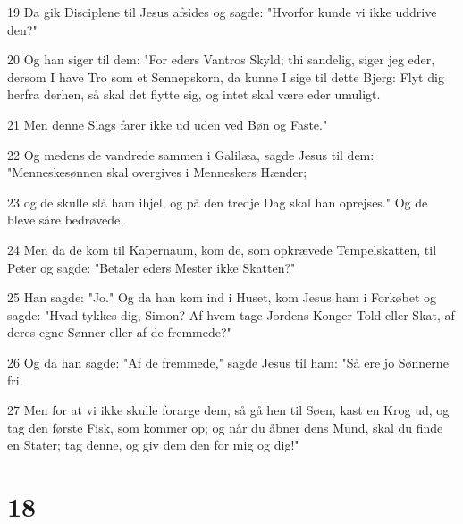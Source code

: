 \par 19 Da gik Disciplene til Jesus afsides og sagde: "Hvorfor kunde vi ikke uddrive den?"
\par 20 Og han siger til dem: "For eders Vantros Skyld; thi sandelig, siger jeg eder, dersom I have Tro som et Sennepskorn, da kunne I sige til dette Bjerg: Flyt dig herfra derhen, så skal det flytte sig, og intet skal være eder umuligt.
\par 21 Men denne Slags farer ikke ud uden ved Bøn og Faste."
\par 22 Og medens de vandrede sammen i Galilæa, sagde Jesus til dem: "Menneskesønnen skal overgives i Menneskers Hænder;
\par 23 og de skulle slå ham ihjel, og på den tredje Dag skal han oprejses." Og de bleve såre bedrøvede.
\par 24 Men da de kom til Kapernaum, kom de, som opkrævede Tempelskatten, til Peter og sagde: "Betaler eders Mester ikke Skatten?"
\par 25 Han sagde: "Jo." Og da han kom ind i Huset, kom Jesus ham i Forkøbet og sagde: "Hvad tykkes dig, Simon? Af hvem tage Jordens Konger Told eller Skat, af deres egne Sønner eller af de fremmede?"
\par 26 Og da han sagde: "Af de fremmede," sagde Jesus til ham: "Så ere jo Sønnerne fri.
\par 27 Men for at vi ikke skulle forarge dem, så gå hen til Søen, kast en Krog ud, og tag den første Fisk, som kommer op; og når du åbner dens Mund, skal du finde en Stater; tag denne, og giv dem den for mig og dig!"

\chapter{18}

